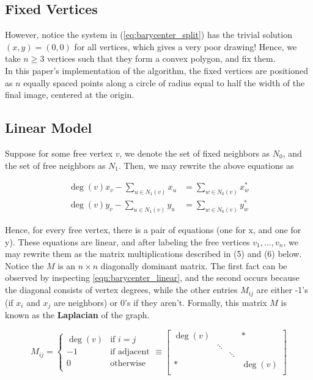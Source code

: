 \documentclass[11pt]{report}
\begin{document}
\subsection{Fixed Vertices}
However, notice the system in (\ref{eq:barycenter_split}) has the trivial solution $(x, y) = (0, 0)$ for all vertices, which gives a very poor drawing! Hence, we take $n \geq 3$ vertices such that they form a convex polygon, and fix them. \\

In this paper's implementation of the algorithm, the fixed vertices are positioned as $n$ equally spaced points along a circle of radius equal to half the width of the final image, centered at the origin.

\subsection{Linear Model}
Suppose for some free vertex $v$, we denote the set of fixed neighbors as $N_0$, and the set of free neighbors as $N_1$. Then, we may rewrite the above equations as

\begin{equation}\label{eqn:barycenter_linear}
    \begin{aligned}
        \deg{(v)}x_v - \sum_{u \in N_1(v)} x_u &= \sum_{w \in N_0(v)} x^*_w \\
        \deg{(v)}y_v - \sum_{u \in N_1(v)} y_u &= \sum_{w \in N_0(v)} y^*_w
    \end{aligned}
\end{equation}

Hence, for every free vertex, there is a pair of equations (one for x, and one for y). These equations are linear, and after labeling the free vertices $v_1, ..., v_n$, we may rewrite them as the matrix multiplications described in (5) and (6) below. Notice the $M$ is an $n \times n$ diagonally dominant matrix. The first fact can be observed by inspecting \ref{eqn:barycenter_linear}, and the second occurs because the diagonal consists of vertex degrees, while the other entries $M_{ij}$ are either -1's (if $x_i$ and $x_j$ are neighbors) or 0's if they aren't. Formally, this matrix $M$ is known as the \textbf{Laplacian} of the graph.

\begin{equation}\label{eqn:barycenter_matrix}
    M_{ij} = \begin{cases}
    \deg(v) &{\text{if $i = j$}} \\
    -1      &{\text{if adjacent}} \\
    0       &{\text{otherwise}} \\
    \end{cases}
    \equiv
    \begin{bmatrix}
    \deg(v) &        &        & * \\
            & \ddots &        & \\
            &        & \ddots & \\
    *       &        &        & \deg(v) \\
    \end{bmatrix}
\end{equation}
\end{document}

